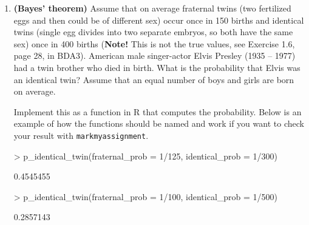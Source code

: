 \documentclass[11pt,a4paper,english]{article}
\begin{document}
\begin{enumerate}
\item {\bf (Bayes' theorem)} Assume that on average fraternal twins (two fertilized eggs and then could be of different sex) occur once in 150 births and identical twins (single egg divides into two separate
embryos, so both have the same sex) once in 400 births (\textbf{Note!} This is not the true values, see Exercise 1.6, page 28, in BDA3).
American male singer-actor Elvis Presley (1935 -- 1977) had a twin brother who died in birth.
What is the probability that Elvis was an identical twin?
Assume that an equal number of boys and girls are born on average.

Implement this as a function in R that computes the probability. Below is an example of how the functions should be named and work if you want to check your result with \texttt{markmyassignment}. 


\begin{Schunk}
\begin{Sinput}
> p_identical_twin(fraternal_prob = 1/125, identical_prob = 1/300)
\end{Sinput}
\begin{Soutput}
[1] 0.4545455
\end{Soutput}
\end{Schunk}


\begin{Schunk}
\begin{Sinput}
> p_identical_twin(fraternal_prob = 1/100, identical_prob = 1/500)
\end{Sinput}
\begin{Soutput}
[1] 0.2857143
\end{Soutput}
\end{Schunk}

\end{enumerate}
\end{document}
